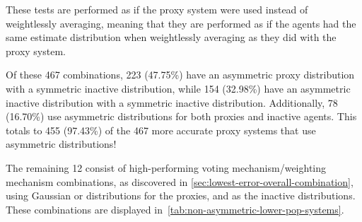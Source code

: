 These tests are performed as if the proxy system were used instead of weightlessly
averaging, meaning that they are performed as if the agents had the same estimate
distribution when weightlessly averaging as they did with the proxy system.

Of these 467 combinations, 223 (47.75\%) have an asymmetric proxy distribution with
a symmetric inactive distribution, while 154 (32.98\%) have an asymmetric inactive
distribution with a symmetric inactive distribution.
Additionally, 78 (16.70\%) use asymmetric distributions for both proxies and
inactive agents.
This totals to 455 (97.43\%) of the 467 more accurate proxy systems that use
asymmetric distributions!

The remaining 12 consist of high-performing voting mechanism/weighting mechanism
combinations, as discovered in \autoref{sec:lowest-error-overall-combination},
using Gaussian or  distributions for the proxies,
and  as the inactive distributions.  
These combinations are displayed in~\autoref{tab:non-asymmetric-lower-pop-systems}.

